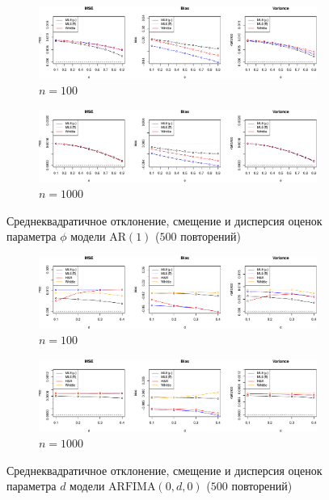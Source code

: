 \documentclass[specialist,
substylefile = spbu_report.rtx,
subf,href,colorlinks=true, 12pt]{disser}
\theoremstyle{definition}
\begin{document}
\begin{figure}[h]
	\centering
	\begin{subfigure}{\textwidth}
		\includegraphics[width=\textwidth]{img/ar1_est_N100.pdf}
		\caption{$n=100$}
	\end{subfigure}
	\begin{subfigure}{\textwidth}
		\includegraphics[width=\textwidth]{img/ar1_est_N1000.pdf}
		\caption{$n=1000$}
	\end{subfigure}
	\caption{Среднеквадратичное отклонение, смещение и дисперсия оценок параметра $\phi$ модели $\mathrm{AR}(1)$ ($500$ повторений)}
	\label{fig:ar1_est}
\end{figure}
\begin{figure}[h]
	\centering
	\begin{subfigure}{\textwidth}
		\includegraphics[width=\textwidth]{img/fi_est_N100.pdf}
		\caption{$n=100$}
	\end{subfigure}
	\begin{subfigure}{\textwidth}
		\includegraphics[width=\textwidth]{img/fi_est_N1000.pdf}
		\caption{$n=1000$}
	\end{subfigure}
	\caption{Среднеквадратичное отклонение, смещение и дисперсия оценок параметра $d$ модели $\mathrm{ARFIMA}(0, d, 0)$ ($500$ повторений)}
	\label{fig:fi_est}
\end{figure}
\end{document}

